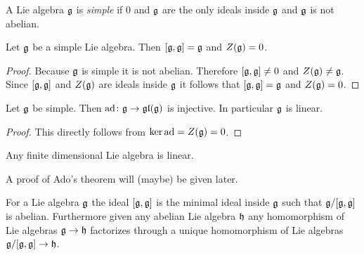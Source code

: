 \begin{defi}
 A Lie algebra $\mathfrak{g}$ is \emph{simple} if $0$ and $\mathfrak{g}$ are the only ideals inside $\mathfrak{g}$ and $\mathfrak{g}$ is not abelian.
\end{defi}


\begin{lem}
 Let $\mathfrak{g}$ be a simple Lie algebra. Then $[\mathfrak{g},\mathfrak{g}] = \mathfrak{g}$ and $Z(\mathfrak{g})=0$.
\end{lem}
\begin{proof}
 Because $\mathfrak{g}$ is simple it is not abelian. Therefore $[\mathfrak{g},\mathfrak{g}] \neq 0$ and $Z(\mathfrak{g}) \neq \mathfrak{g}$. Since $[\mathfrak{g},\mathfrak{g}]$ and $Z(\mathfrak{g})$ are ideals inside $\mathfrak{g}$ it follows that $[\mathfrak{g},\mathfrak{g}] = \mathfrak{g}$ and $Z(\mathfrak{g}) = 0$.
\end{proof}


\begin{cor}
 Let $\mathfrak{g}$ be simple. Then $\operatorname{ad} \colon \mathfrak{g} \to \mathfrak{gl}(\mathfrak{g})$ is injective. In particular $\mathfrak{g}$ is linear.
\end{cor}
\begin{proof}
 This directly follows from $\ker \operatorname{ad} = Z(\mathfrak{g}) = 0$.
\end{proof}


\begin{thrm}[Ado]
 Any finite dimensional Lie algebra is linear.
\end{thrm}


A proof of Ado’s theorem will (maybe) be given later.


\begin{rem}
 For a Lie algebra $\mathfrak{g}$ the ideal $[\mathfrak{g},\mathfrak{g}]$ is the minimal ideal inside $\mathfrak{g}$ such that $\mathfrak{g}/[\mathfrak{g},\mathfrak{g}]$ is abelian. Furthermore given any abelian Lie algebra $\mathfrak{h}$ any homomorphism of Lie algebras $\mathfrak{g} \to \mathfrak{h}$ factorizes through a unique homomorphism of Lie algebras $\mathfrak{g}/[\mathfrak{g},\mathfrak{g}] \to \mathfrak{h}$.
 \begin{center}
 \end{center}
\end{rem}


